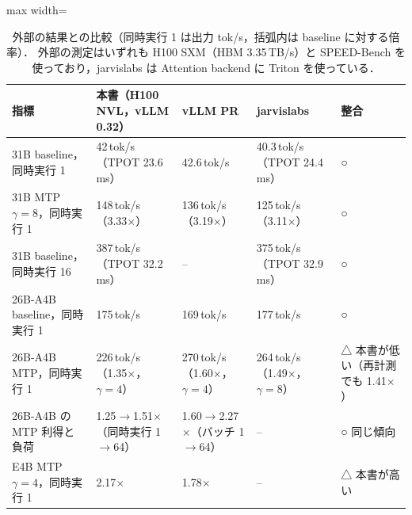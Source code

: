 \begin{table}[htbp]\centering\small
\caption{外部の結果との比較（同時実行 1 は出力 tok/s，括弧内は baseline に対する倍率）．
外部の測定はいずれも H100 SXM（HBM 3.35\,TB/s）と SPEED-Bench を使っており，jarvislabs は Attention backend に Triton を使っている．}
\label{tab:external}
\begin{adjustbox}{max width=\linewidth}
\begin{tabular}{lllll}\toprule
指標 & 本書（H100 NVL，vLLM 0.32） & vLLM PR\cite{vllmpr} & jarvislabs\cite{jarvislabs} & 整合 \\\midrule
31B baseline，同時実行 1 & 42\,tok/s（TPOT 23.6\,ms） & 42.6\,tok/s & 40.3\,tok/s（TPOT 24.4\,ms） & ○ \\
31B MTP $\gamma=8$，同時実行 1 & 148\,tok/s（3.33$\times$） & 136\,tok/s（3.19$\times$） & 125\,tok/s（3.11$\times$） & ○ \\
31B baseline，同時実行 16 & 387\,tok/s（TPOT 32.2\,ms） & -- & 375\,tok/s（TPOT 32.9\,ms） & ○ \\
26B-A4B baseline，同時実行 1 & 175\,tok/s & 169\,tok/s & 177\,tok/s & ○ \\
26B-A4B MTP，同時実行 1 & 226\,tok/s（1.35$\times$，$\gamma=4$） & 270\,tok/s（1.60$\times$，$\gamma=4$） & 264\,tok/s（1.49$\times$，$\gamma=8$） & △ 本書が低い（再計測でも 1.41$\times$） \\
26B-A4B の MTP 利得と負荷 & 1.25$\to$1.51$\times$（同時実行 1$\to$64） & 1.60$\to$2.27$\times$（バッチ 1$\to$64） & -- & ○ 同じ傾向 \\
E4B MTP $\gamma=4$，同時実行 1 & 2.17$\times$ & 1.78$\times$ & -- & △ 本書が高い \\
\bottomrule\end{tabular}
\end{adjustbox}
\end{table}

